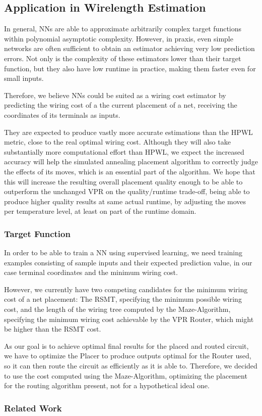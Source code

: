 \subsection{Application in Wirelength Estimation}

In general, \glspl{NN} are able to approximate arbitrarily complex target functions\cite{TODO} within polynomial asymptotic complexity\cite{NN-complexity-web}. However, in praxis, even simple networks are often sufficient to obtain an estimator achieving very low prediction errors. Not only is the complexity of these estimators lower than their target function, but they also have low runtime in practice, making them faster even for small inputs.

Therefore, we believe \glspl{NN} could be suited as a wiring cost estimator by predicting the wiring cost of a the current placement of a net, receiving the coordinates of its terminals as inputs. 

They are expected to produce vastly more accurate estimations than the \gls{HPWL} metric, close to the real optimal wiring cost. Although they will also take substantially more computational effort than \gls{HPWL}, we expect the increased accuracy will help the simulated annealing placement algorithm to correctly judge the effects of its moves, which is an essential part of the algorithm. We hope that this will increase the resulting overall placement quality enough to be able to outperform the unchanged \gls{VPR} on the quality/runtime trade-off, being able to produce higher quality results at same actual runtime, by adjusting the moves per temperature level, at least on part of the runtime domain.

\subsubsection{Target Function}

In order to be able to train a \gls{NN} using supervised learning, we need training examples consisting of sample inputs and their expected prediction value, in our case terminal coordinates and the minimum wiring cost.

However, we currently have two competing candidates for the minimum wiring cost of a net placement: The \gls{RSMT}, specifying the minimum possible wiring cost, and the length of the wiring tree computed by the Maze-Algorithm\cite{TODO}, specifying the minimum wiring cost achievable by the \gls{VPR} Router, which might be higher than the \gls{RSMT} cost.

As our goal is to achieve optimal final results for the placed and routed circuit, we have to optimize the Placer to produce outputs optimal for the Router used, so it can then route the circuit as efficiently as it is able to. Therefore, we decided to use the cost computed using the Maze-Algorithm, optimizing the placement for the routing algorithm present, not for a hypothetical ideal one.

\subsubsection{Related Work}
